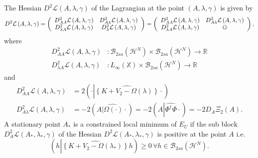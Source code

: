 \documentclass[aps,preprint]{revtex4}%
\begin{document}
The Hessian $D^{2}\mathcal{L}\left(  A,\lambda,\gamma\right)  $ of the
Lagrangian at the point $\left(  A,\lambda,\gamma\right)  $ is given by
\begin{equation}
D^{2}\mathcal{L}\left(  A,\lambda,\gamma\right)  =\left(
\begin{array}
[c]{cc}%
D_{AA}^{2}\mathcal{L}\left(  A,\lambda,\gamma\right)  & D_{A\lambda}%
^{2}\mathcal{L}\left(  A,\lambda,\gamma\right) \\
D_{\lambda A}^{2}\mathcal{L}\left(  A,\lambda,\gamma\right)  & D_{\lambda}%
^{2}\mathcal{L}\left(  A,\lambda,\gamma\right)
\end{array}
\right)  =\left(
\begin{array}
[c]{cc}%
D_{AA}^{2}\mathcal{L}\left(  A,\lambda,\gamma\right)  & D_{A\lambda}%
^{2}\mathcal{L}\left(  A,\lambda,\gamma\right) \\
D_{\lambda A}^{2}\mathcal{L}\left(  A,\lambda,\gamma\right)  & \mathbb{O}%
\end{array}
\right)  ,
\end{equation}
where%
\begin{align}
D_{AA}^{2}\mathcal{L}\left(  A,\lambda,\gamma\right)   &  :\mathcal{B}%
_{2sa}\left(  \mathcal{H}^{N}\right)  \times\mathcal{B}_{2sa}\left(
\mathcal{H}^{N}\right)  \rightarrow\mathbb{R}\nonumber\\
D_{\lambda A}^{2}\mathcal{L}\left(  A,\lambda,\gamma\right)   &  :L_{\infty
}\left(  \mathbb{X}\right)  \times\mathcal{B}_{2sa}\left(  \mathcal{H}%
^{N}\right)  \rightarrow\mathbb{R}%
\end{align}
and%
\begin{align}
D_{AA}^{2}\mathcal{L}\left(  A,\lambda,\gamma\right)   &  =2\left(
\cdot\left\vert \widehat{\left\{  K+V_{2}-\Omega\left(  \lambda\right)
\right\}  }\right.  \cdot\right) \nonumber\\
D_{A\lambda}^{2}\mathcal{L}\left(  A,\lambda,\gamma\right)   &  =-2\left(
A\widehat{\left\vert \Omega\left(  \cdot\right)  \right.  }\cdot\right)
=-2\left(  A\left\vert \widehat{\Phi^{\dagger}\Phi}\right.  \cdot\right)
=-2D_{A}\Xi_{2}\left(  A\right)  .
\end{align}
A stationary point $A_{\ast}$ is a constrained local minimum of $E_{U}$ if the
sub block $D_{A}^{2}\mathcal{L}\left(  A_{\ast},\lambda_{\ast},\gamma\right)
$ of the Hessian $D^{2}\mathcal{L}\left(  A_{\ast},\lambda_{\ast}%
,\gamma\right)  $ is positive at the point $A$ i.e.%
\begin{equation}
\left(  h\left\vert \widehat{\left\{  K+V_{2}-\Omega\left(  \lambda_{\ast
}\right)  \right\}  }\right.  h\right)  \geq0\,\forall h\in\mathcal{B}%
_{2sa}\left(  \mathcal{H}^{N}\right)  .
\end{equation}
\end{document}
